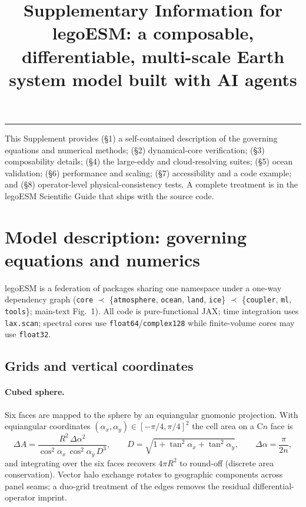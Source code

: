 \documentclass[11pt]{article}
\title{\textbf{Supplementary Information for\\[2pt]
legoESM: a composable, differentiable, multi-scale Earth system model built with AI agents}}
\author{}
\date{}
\begin{document}
\maketitle
\vspace{-2.2em}
\tableofcontents
\bigskip
\hrule
\bigskip

\noindent This Supplement provides (\S1) a self-contained description of the governing
equations and numerical methods; (\S2) dynamical-core verification; (\S3) composability
details; (\S4) the large-eddy and cloud-resolving suites; (\S5) ocean validation; (\S6)
performance and scaling; (\S7) accessibility and a code example; and (\S8) operator-level
physical-consistency tests. A complete treatment is in the legoESM Scientific Guide that ships
with the source code\cite{Kochkov2024}.

\section{Model description: governing equations and numerics}
legoESM is a federation of packages sharing one namespace under a one-way dependency graph
(\texttt{core} $\prec$ \{\texttt{atmosphere}, \texttt{ocean}, \texttt{land}, \texttt{ice}\}
$\prec$ \{\texttt{coupler}, \texttt{ml}, \texttt{tools}\}; main-text Fig.~1). All code is
pure-functional JAX; time integration uses \texttt{lax.scan}; spectral cores use
\texttt{float64}/\texttt{complex128} while finite-volume cores may use \texttt{float32}.

\subsection{Grids and vertical coordinates}
\paragraph{Cubed sphere.} Six faces are mapped to the sphere by an equiangular gnomonic
projection\cite{Ronchi1996,PutmanLin2007}. With equiangular coordinates
$(\alpha_x,\alpha_y)\in[-\pi/4,\pi/4]^2$ the cell area on a C$n$ face is
\begin{equation}
\Delta A=\frac{R^2\,\Delta\alpha^2}{\cos^2\!\alpha_x\,\cos^2\!\alpha_y\,D^3},\qquad
D=\sqrt{1+\tan^2\!\alpha_x+\tan^2\!\alpha_y},\qquad \Delta\alpha=\frac{\pi}{2n},
\end{equation}
and integrating over the six faces recovers $4\pi R^2$ to round-off (discrete area
conservation). Vector halo exchange rotates to geographic components across panel seams; a
duo-grid treatment of the edges removes the residual differential-operator imprint\cite{Mouallem2023}.
\end{document}
